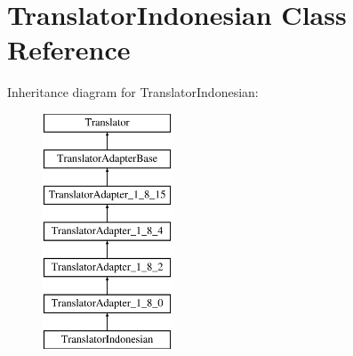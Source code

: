\hypertarget{class_translator_indonesian}{}\section{Translator\+Indonesian Class Reference}
\label{class_translator_indonesian}
Inheritance diagram for Translator\+Indonesian\+:\begin{figure}[H]
\begin{center}
\leavevmode
\includegraphics[height=7.000000cm]{class_translator_indonesian}
\end{center}
\end{figure}
